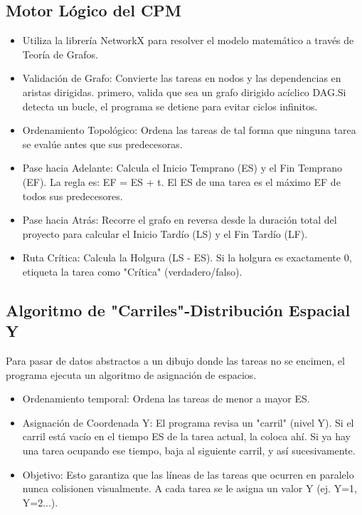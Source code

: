\documentclass[10pt,a4paper]{article}
\begin{document}
\subsection{Motor Lógico del CPM}
\begin{itemize}
    \item Utiliza la librería NetworkX para resolver el modelo matemático a través de Teoría de Grafos.
    \item Validación de Grafo: Convierte las tareas en nodos y las dependencias en aristas dirigidas. 
    primero, valida que sea un grafo dirigido acíclico DAG.Si detecta un bucle, el programa se detiene para evitar ciclos infinitos.
    \item Ordenamiento Topológico: Ordena las tareas de tal forma que ninguna tarea se evalúe antes que sus predecesoras.
    \item Pase hacia Adelante: Calcula el Inicio Temprano (ES) y el Fin Temprano (EF). La regla es: EF = ES + t. El ES de una tarea es el máximo EF de todos sus predecesores.
    \item Pase hacia Atrás: Recorre el grafo en reversa desde la duración total del proyecto para calcular el Inicio Tardío (LS) y el Fin Tardío (LF).
    \item Ruta Crítica: Calcula la Holgura (LS - ES). Si la holgura es exactamente 0, etiqueta la tarea como "Crítica" (verdadero/falso).
\end{itemize}

\subsection{Algoritmo de "Carriles"-Distribución Espacial Y}

Para pasar de datos abstractos a un dibujo donde las tareas no se encimen, el programa ejecuta un algoritmo de asignación de espacios.

\begin{itemize}
    \item Ordenamiento temporal: Ordena las tareas de menor a mayor ES.
    \item Asignación de Coordenada Y: El programa revisa un "carril" (nivel Y). Si el carril está vacío en el tiempo ES de la tarea actual, la coloca ahí. Si ya hay una tarea ocupando ese tiempo, baja al siguiente carril, y así sucesivamente.
    \item Objetivo: Esto garantiza que las líneas de las tareas que ocurren en paralelo nunca colisionen visualmente. A cada tarea se le asigna un valor Y (ej. Y=1, Y=2...).
\end{itemize}
\end{document}
